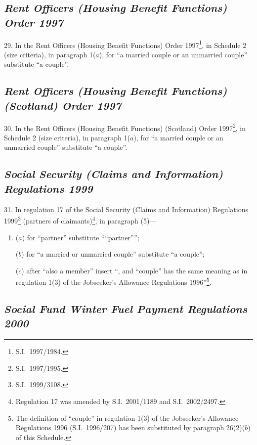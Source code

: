 \documentclass[12pt,a4paper]{article}
\begin{document}
\subsection*{\itshape Rent Officers (Housing Benefit Functions) Order 1997}

29.  In the Rent Officers (Housing Benefit Functions) Order 1997\footnote{S.I.\ 1997/1984.}, in Schedule 2 (size criteria), in paragraph 1($a$), for “a married couple or an unmarried couple” substitute “a couple”.

\subsection*{\itshape Rent Officers (Housing Benefit Functions) (Scotland) Order 1997}

30.  In the Rent Officers (Housing Benefit Functions) (Scotland) Order 1997\footnote{S.I.\ 1997/1995.}, in Schedule 2 (size criteria), in paragraph 1($a$), for “a married couple or an unmarried couple” substitute “a couple”.

\subsection*{\itshape Social Security (Claims and Information) Regulations 1999}

31.  In regulation 17 of the Social Security (Claims and Information) Regulations 1999\footnote{S.I.\ 1999/3108.} (partners of claimants)\footnote{Regulation 17 was amended by S.I.\ 2001/1189 and S.I.\ 2002/2497.}, in paragraph (5)—
\begin{enumerate}\item[]
($a$) for “partner” substitute ““partner””;

($b$) for “a married or unmarried couple” substitute “a couple”;

($c$) after “also a member” insert “, and “couple” has the same meaning as in regulation 1(3) of the Jobseeker’s Allowance Regulations 1996”\footnote{The definition of “couple” in regulation 1(3) of the Jobseeker’s Allowance Regulations 1996 (S.I.\ 1996/207) has been substituted by paragraph 26(2)($b$) of this Schedule.}.
\end{enumerate}

\subsection*{\itshape Social Fund Winter Fuel Payment Regulations 2000}
\end{document}
